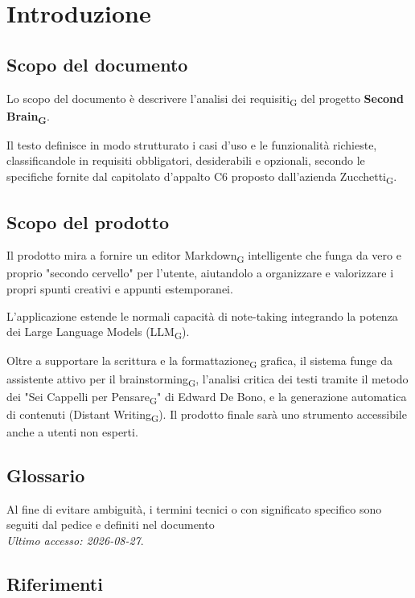 \section{Introduzione}

\subsection{Scopo del documento}
Lo scopo del documento è descrivere l'analisi dei requisiti\textsubscript{G} del progetto \textbf{Second Brain\textsubscript{G}}. 

Il testo definisce in modo strutturato i casi d’uso e le funzionalità richieste, classificandole in requisiti obbligatori, desiderabili e opzionali, secondo le specifiche fornite dal capitolato d'appalto C6 proposto dall'azienda Zucchetti\textsubscript{G}.

\subsection{Scopo del prodotto}
Il prodotto mira a fornire un editor Markdown\textsubscript{G} intelligente che funga da vero e proprio "secondo cervello" per l'utente, aiutandolo a organizzare e valorizzare i propri spunti creativi e appunti estemporanei. 

L'applicazione estende le normali capacità di note-taking integrando la potenza dei Large Language Models (LLM\textsubscript{G}). 

Oltre a supportare la scrittura e la formattazione\textsubscript{G} grafica, il sistema funge da assistente attivo per il brainstorming\textsubscript{G}, l'analisi critica dei testi tramite il metodo dei "Sei Cappelli per Pensare\textsubscript{G}" di Edward De Bono, e la generazione automatica di contenuti (Distant Writing\textsubscript{G}). 
Il prodotto finale sarà uno strumento accessibile anche a utenti non esperti.

\subsection{Glossario}
Al fine di evitare ambiguità, i termini tecnici o con significato specifico sono seguiti dal pedice e definiti nel documento  \\
\textit{Ultimo accesso: 2026-08-27}.

\subsection{Riferimenti}

